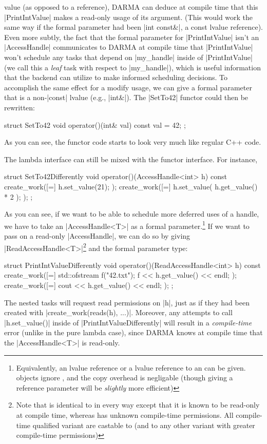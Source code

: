 value (as opposed to a reference), DARMA can deduce at compile time that this
|PrintIntValue| makes a read-only usage of its argument.  (This would work the
same way if the formal parameter had been |int const&|, a const lvalue
reference).  Even more subtly, the fact that the formal parameter for
|PrintIntValue| isn't an |AccessHandle| communicates to DARMA at compile time
that |PrintIntValue| won't schedule any tasks that depend on |my_handle| inside
of |PrintIntValue| (we call this a {\it leaf} task with respect to |my_handle|),
which is useful information that the backend can utilize to make informed
scheduling decisions.  To accomplish the same effect for a modify usage, we can
give a formal parameter that is a non-|const| lvalue (e.g., |int&|).  The
|SetTo42| functor could then be rewritten:
\begin{CppCodeNumb}
struct SetTo42 {
  void operator()(int& val) const {
    val = 42;
  }
};
\end{CppCodeNumb}
As you can see, the functor code starts to look very much like regular C++ code.

The lambda interface can still be mixed with the functor interface.  For
instance,
\begin{CppCodeNumb}
struct SetTo42Differently {
  void operator()(AccessHandle<int> h) const {
    create_work([=]{
      h.set_value(21);
    });
    create_work([=]{
      h.set_value( h.get_value() * 2 );
    });
  }
};
\end{CppCodeNumb}
As you can see, if we want to be able to schedule more deferred uses of a
handle, we have to take an |AccessHandle<T>| as a formal
parameter.\footnote{Equivalently, an lvalue reference or a 
lvalue reference to an  can be given. 
 objects ignore , and the copy
overhead is negligable (though giving a reference parameter will be {\it
slightly} more efficient)}  If we want to pass on a read-only |AccessHandle|, we
can do so by giving |ReadAccessHandle<T>|\footnote{Note that
 is identical to 
in every way except that it is known to be read-only at compile time, whereas
 has unknown compile-time permissions.  All
compile-time qualified  variant are castable to
 (and to any other 
variant with greater compile-time permissions)} and the formal parameter type:
\begin{CppCodeNumb}
struct PrintIntValueDifferently {
  void operator()(ReadAccessHandle<int> h) const {
    create_work([=]{
      std::ofstream f("42.txt");
      f << h.get_value() << endl;
    });
    create_work([=]{
      cout << h.get_value() << endl;
    });
  }
};
\end{CppCodeNumb}
The nested tasks will request read permissions on |h|, just as if they had been
created with |create_work(reads(h), ...)|.  Moreover, any attempts to call
|h.set_value()| inside of |PrintIntValueDifferently| will result in a {\it
compile-time} error (unlike in the pure lambda case), since DARMA knows at
compile time that the |AccessHandle<T>| is read-only.  

